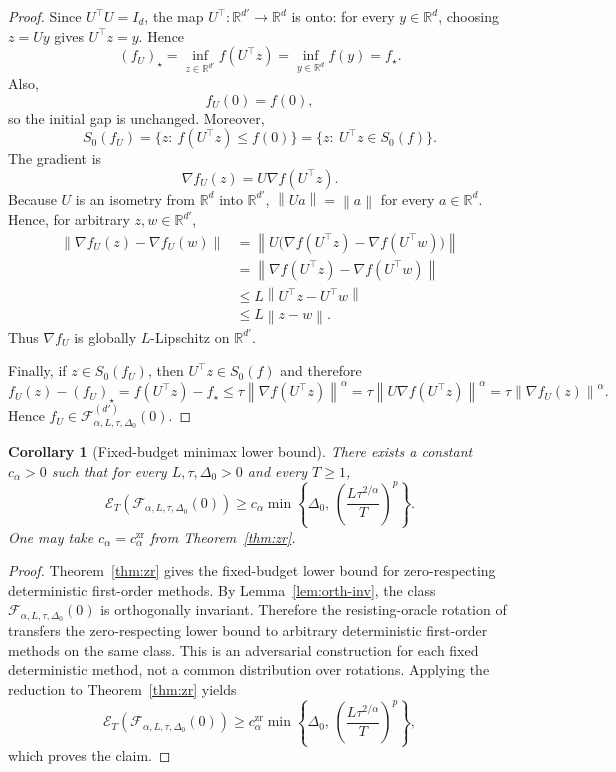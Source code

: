 \documentclass[11pt]{article}
\newtheorem{corollary}[theorem]{Corollary}
\newcommand{\R}{\mathbb{R}}
\newcommand{\norm}[1]{\left\lVert #1\right\rVert}
\begin{document}
\begin{proof}
Since \(U^\top U=I_d\), the map \(U^\top:\R^{d'}\to\R^d\) is onto: for every \(y\in\R^d\), choosing \(z=Uy\)
gives \(U^\top z=y\). Hence
\[
(f_U)_\star
=
\inf_{z\in\R^{d'}} f(U^\top z)
=
\inf_{y\in\R^d} f(y)
=
f_\star.
\]
Also,
\[
f_U(0)=f(0),
\]
so the initial gap is unchanged.
Moreover,
\[
S_0(f_U)=\{z:\ f(U^\top z)\le f(0)\}=\{z:\ U^\top z\in S_0(f)\}.
\]
The gradient is
\[
\nabla f_U(z)=U\nabla f(U^\top z).
\]
Because \(U\) is an isometry from \(\R^d\) into \(\R^{d'}\), \(\norm{Ua}=\norm a\) for every \(a\in\R^d\). Hence, for
arbitrary $z,w\in\R^{d'}$,
\[
\begin{aligned}
\norm{\nabla f_U(z)-\nabla f_U(w)}
&=
\norm{U\bigl(\nabla f(U^\top z)-\nabla f(U^\top w)\bigr)}\\
&=
\norm{\nabla f(U^\top z)-\nabla f(U^\top w)}\\
&\le
L\norm{U^\top z-U^\top w}\\
&\le
L\norm{z-w}.
\end{aligned}
\]
Thus $\nabla f_U$ is globally $L$-Lipschitz on $\R^{d'}$.

Finally, if $z\in S_0(f_U)$, then $U^\top z\in S_0(f)$ and therefore
\[
f_U(z)-(f_U)_\star
=
f(U^\top z)-f_\star
\le
\tau\norm{\nabla f(U^\top z)}^\alpha
=
\tau\norm{U\nabla f(U^\top z)}^\alpha
=
\tau\norm{\nabla f_U(z)}^\alpha.
\]
Hence $f_U\in \mathcal F^{(d')}_{\alpha,L,\tau,\Delta_0}(0)$.
\end{proof}

\begin{corollary}[Fixed-budget minimax lower bound]
\label{cor:fixed-budget-lower}
There exists a constant $c_\alpha>0$ such that for every $L,\tau,\Delta_0>0$ and every $T\ge 1$,
\[
\mathcal E_T\!\left(\mathcal F_{\alpha,L,\tau,\Delta_0}(0)\right)
\ge
c_\alpha
\min\!\left\{
\Delta_0,\,
\left(\frac{L\tau^{2/\alpha}}{T}\right)^p
\right\}.
\]
One may take $c_\alpha=c_\alpha^{\mathrm{zr}}$ from Theorem~\ref{thm:zr}.
\end{corollary}

\begin{proof}
Theorem~\ref{thm:zr} gives the fixed-budget lower bound for zero-respecting deterministic first-order methods.
By Lemma~\ref{lem:orth-inv}, the class \(\mathcal F_{\alpha,L,\tau,\Delta_0}(0)\) is orthogonally invariant.
Therefore the resisting-oracle rotation of
\citet[Proposition~1 and the surrounding discussion]{CarmonDuchiHinderSidford2021} transfers the zero-respecting lower
bound to arbitrary deterministic first-order methods on the same class. This is an adversarial construction for each
fixed deterministic method, not a common distribution over rotations. Applying the reduction to
Theorem~\ref{thm:zr} yields
\[
\mathcal E_T\!\left(\mathcal F_{\alpha,L,\tau,\Delta_0}(0)\right)
\ge
c_\alpha^{\mathrm{zr}}
\min\!\left\{
\Delta_0,\,
\left(\frac{L\tau^{2/\alpha}}{T}\right)^p
\right\},
\]
which proves the claim.
\end{proof}
\end{document}
